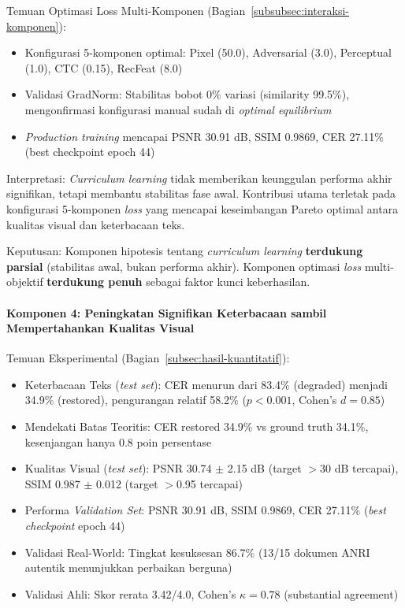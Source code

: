 \documentclass[12pt,a4paper]{article}
\begin{document}
Temuan Optimasi Loss Multi-Komponen (Bagian~\ref{subsubsec:interaksi-komponen}):

\begin{itemize}[nosep]
    \item Konfigurasi 5-komponen optimal: Pixel (50.0), Adversarial (3.0), Perceptual (1.0), CTC (0.15), RecFeat (8.0)
    \item Validasi GradNorm: Stabilitas bobot 0\% variasi (similarity 99.5\%), mengonfirmasi konfigurasi manual sudah di \textit{optimal equilibrium}
    \item \textit{Production training} mencapai PSNR 30.91 dB, SSIM 0.9869, CER 27.11\% (best checkpoint epoch 44)
\end{itemize}

Interpretasi: \textit{Curriculum learning} tidak memberikan keunggulan performa akhir signifikan, tetapi membantu stabilitas fase awal. Kontribusi utama terletak pada konfigurasi 5-komponen \textit{loss} yang mencapai keseimbangan Pareto optimal antara kualitas visual dan keterbacaan teks.

Keputusan: Komponen hipotesis tentang \textit{curriculum learning} \textbf{terdukung parsial} (stabilitas awal, bukan performa akhir). Komponen optimasi \textit{loss} multi-objektif \textbf{terdukung penuh} sebagai faktor kunci keberhasilan.

\vspace{0.5em}

\paragraph{Komponen 4: Peningkatan Signifikan Keterbacaan sambil Mempertahankan Kualitas Visual}

Temuan Eksperimental (Bagian~\ref{subsec:hasil-kuantitatif}):

\begin{itemize}[nosep]
    \item Keterbacaan Teks (\textit{test set}): CER menurun dari 83.4\% (degraded) menjadi 34.9\% (restored), pengurangan relatif 58.2\% ($p < 0.001$, Cohen's $d = 0.85$)
    \item Mendekati Batas Teoritis: CER restored 34.9\% vs ground truth 34.1\%, kesenjangan hanya 0.8 poin persentase
    \item Kualitas Visual (\textit{test set}): PSNR 30.74 $\pm$ 2.15 dB (target $>$30 dB tercapai), SSIM 0.987 $\pm$ 0.012 (target $>$0.95 tercapai)
    \item Performa \textit{Validation Set}: PSNR 30.91 dB, SSIM 0.9869, CER 27.11\% (\textit{best checkpoint} epoch 44)
    \item Validasi Real-World: Tingkat kesuksesan 86.7\% (13/15 dokumen ANRI autentik menunjukkan perbaikan berguna)
    \item Validasi Ahli: Skor rerata 3.42/4.0, Cohen's $\kappa = 0.78$ (substantial agreement)
\end{itemize}
\end{document}
